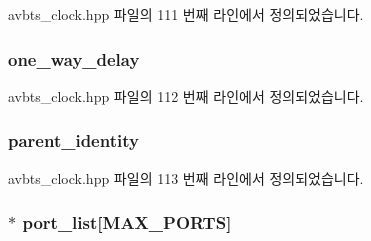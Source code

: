 avbts\+\_\+clock.\+hpp 파일의 111 번째 라인에서 정의되었습니다.

\subsubsection[{\texorpdfstring{one\+\_\+way\+\_\+delay}{one_way_delay}}]{ one\+\_\+way\+\_\+delay\hspace{0.3cm}{\ttfamily [private]}}\hypertarget{class_i_e_e_e1588_clock_a5a4bd75d495b6d9d4fa79d6c14cc6584}{}\label{class_i_e_e_e1588_clock_a5a4bd75d495b6d9d4fa79d6c14cc6584}


avbts\+\_\+clock.\+hpp 파일의 112 번째 라인에서 정의되었습니다.

\subsubsection[{\texorpdfstring{parent\+\_\+identity}{parent_identity}}]{ parent\+\_\+identity\hspace{0.3cm}{\ttfamily [private]}}\hypertarget{class_i_e_e_e1588_clock_a5390ac626c54d20e32c622d31b05049c}{}\label{class_i_e_e_e1588_clock_a5390ac626c54d20e32c622d31b05049c}


avbts\+\_\+clock.\+hpp 파일의 113 번째 라인에서 정의되었습니다.

\subsubsection[{\texorpdfstring{port\+\_\+list}{port_list}}]{$\ast$ port\+\_\+list\mbox{[}{\bf M\+A\+X\+\_\+\+P\+O\+R\+TS}\mbox{]}\hspace{0.3cm}{\ttfamily [private]}}\hypertarget{class_i_e_e_e1588_clock_a47de36fc664f1b0c667d75d1c1639589}{}\label{class_i_e_e_e1588_clock_a47de36fc664f1b0c667d75d1c1639589}


